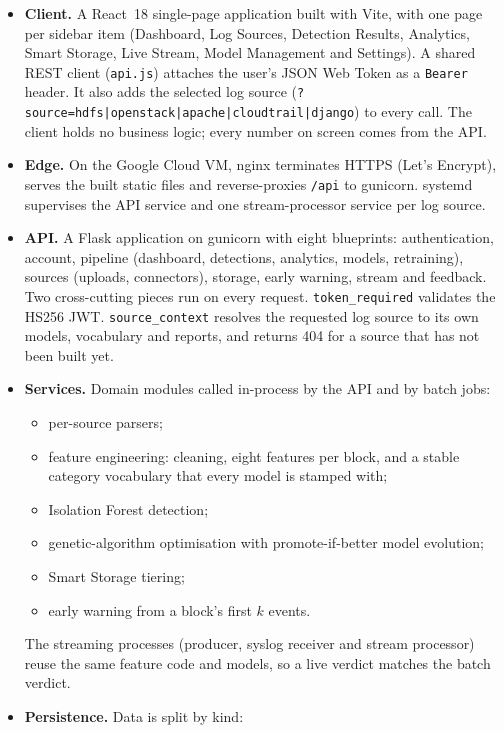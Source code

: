 \begin{itemize}
  \item \textbf{Client.} A React~18 single-page application built with Vite, with one page per sidebar item (Dashboard, Log Sources, Detection Results, Analytics, Smart Storage, Live Stream, Model Management and Settings). A shared REST client (\texttt{api.js}) attaches the user's JSON Web Token as a \texttt{Bearer} header. It also adds the selected log source (\texttt{?source=hdfs|openstack|apache|cloudtrail|django}) to every call. The client holds no business logic; every number on screen comes from the API.
  \item \textbf{Edge.} On the Google Cloud VM, nginx terminates HTTPS (Let's Encrypt), serves the built static files and reverse-proxies \texttt{/api} to gunicorn. systemd supervises the API service and one stream-processor service per log source.
  \item \textbf{API.} A Flask application on gunicorn with eight blueprints: authentication, account, pipeline (dashboard, detections, analytics, models, retraining), sources (uploads, connectors), storage, early warning, stream and feedback. Two cross-cutting pieces run on every request. \texttt{token\_required} validates the HS256 JWT. \texttt{source\_context} resolves the requested log source to its own models, vocabulary and reports, and returns 404 for a source that has not been built yet.
  \item \textbf{Services.} Domain modules called in-process by the API and by batch jobs:
  \begin{itemize}
    \item per-source parsers;
    \item feature engineering: cleaning, eight features per block, and a stable category vocabulary that every model is stamped with;
    \item Isolation Forest detection;
    \item genetic-algorithm optimisation with promote-if-better model evolution;
    \item Smart Storage tiering;
    \item early warning from a block's first $k$ events.
  \end{itemize}
  The streaming processes (producer, syslog receiver and stream processor) reuse the same feature code and models, so a live verdict matches the batch verdict.
  \item \textbf{Persistence.} Data is split by kind:
  \begin{itemize}

\end{itemize}
\end{itemize}
